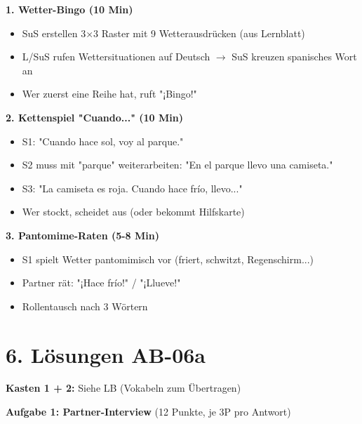 \documentclass[11pt, a4paper]{article}
\newcommand{\sequenz}{06}
\newcommand{\block}{a}
\begin{document}
\begin{spielebox}
\textbf{1. Wetter-Bingo (10 Min)}
\begin{itemize}
    \item SuS erstellen 3×3 Raster mit 9 Wetterausdrücken (aus Lernblatt)
    \item L/SuS rufen Wettersituationen auf Deutsch $\rightarrow$ SuS kreuzen spanisches Wort an
    \item Wer zuerst eine Reihe hat, ruft "¡Bingo!"
\end{itemize}

\vspace{0.5em}

\textbf{2. Kettenspiel "Cuando..." (10 Min)}
\begin{itemize}
    \item S1: "Cuando hace sol, voy al parque."
    \item S2 muss mit "parque" weiterarbeiten: "En el parque llevo una camiseta."
    \item S3: "La camiseta es roja. Cuando hace frío, llevo..."
    \item Wer stockt, scheidet aus (oder bekommt Hilfskarte)
\end{itemize}

\vspace{0.5em}

\textbf{3. Pantomime-Raten (5-8 Min)}
\begin{itemize}
    \item S1 spielt Wetter pantomimisch vor (friert, schwitzt, Regenschirm...)
    \item Partner rät: "¡Hace frío!" / "¡Llueve!"
    \item Rollentausch nach 3 Wörtern
\end{itemize}
\end{spielebox}


\section*{6. Lösungen AB-\sequenz\block}

\textbf{Kasten 1 + 2:} Siehe LB (Vokabeln zum Übertragen)

\vspace{0.5em}

\textbf{Aufgabe 1: Partner-Interview} (12 Punkte, je 3P pro Antwort)
\end{document}

